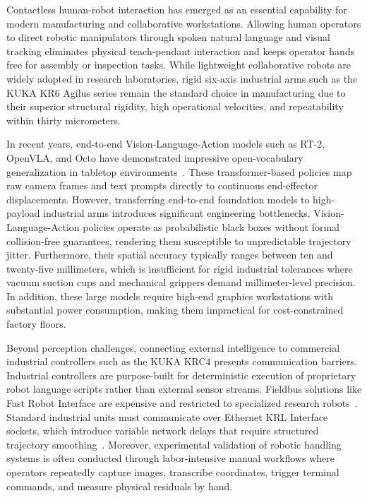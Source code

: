 \documentclass[runningheads]{llncs}
\begin{document}
Contactless human-robot interaction has emerged as an essential capability for modern manufacturing and collaborative workstations. Allowing human operators to direct robotic manipulators through spoken natural language and visual tracking eliminates physical teach-pendant interaction and keeps operator hands free for assembly or inspection tasks. While lightweight collaborative robots are widely adopted in research laboratories, rigid six-axis industrial arms such as the KUKA KR6 Agilus series remain the standard choice in manufacturing due to their superior structural rigidity, high operational velocities, and repeatability within thirty micrometers.

In recent years, end-to-end Vision-Language-Action models such as RT-2, OpenVLA, and Octo have demonstrated impressive open-vocabulary generalization in tabletop environments~\cite{rt2_2023,openvla2024,octo2024}. These transformer-based policies map raw camera frames and text prompts directly to continuous end-effector displacements. However, transferring end-to-end foundation models to high-payload industrial arms introduces significant engineering bottlenecks. Vision-Language-Action policies operate as probabilistic black boxes without formal collision-free guarantees, rendering them susceptible to unpredictable trajectory jitter. Furthermore, their spatial accuracy typically ranges between ten and twenty-five millimeters, which is insufficient for rigid industrial tolerances where vacuum suction cups and mechanical grippers demand millimeter-level precision. In addition, these large models require high-end graphics workstations with substantial power consumption, making them impractical for cost-constrained factory floors.

Beyond perception challenges, connecting external intelligence to commercial industrial controllers such as the KUKA KRC4 presents communication barriers. Industrial controllers are purpose-built for deterministic execution of proprietary robot language scripts rather than external sensor streams. Fieldbus solutions like Fast Robot Interface are expensive and restricted to specialized research robots~\cite{lbr_stack2024}. Standard industrial units must communicate over Ethernet KRL Interface sockets, which introduce variable network delays that require structured trajectory smoothing~\cite{kuka_eki_eval2022}. Moreover, experimental validation of robotic handling systems is often conducted through labor-intensive manual workflows where operators repeatedly capture images, transcribe coordinates, trigger terminal commands, and measure physical residuals by hand.
\end{document}
